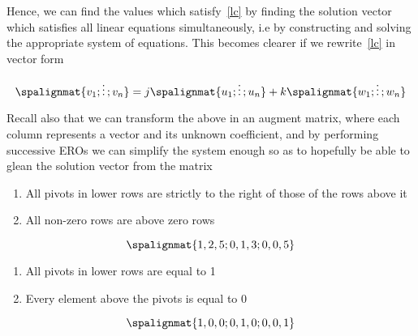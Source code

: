 \documentclass[english,course]{Notes}
\let\mat=\spalignmat
\begin{document}
	      \par{Hence, we can find the values which satisfy~\ref{lc} by finding the solution vector which satisfies all linear equations simultaneously, i.e  by constructing and solving the appropriate system of equations. This becomes clearer if we rewrite~\ref{lc} in vector form }
	      
	      $$ \mat{v_{1};\vdots;v_{n}} = j\mat{u_{1};\vdots;u_{n}} + k\mat{w_{1};\vdots;w_{n}} $$
	      
	      \par{Recall also that we can transform the above in an augment matrix, where each column represents a vector and its unknown coefficient, and by performing successive EROs we can simplify the system enough so as to hopefully be able to glean the solution vector from the matrix}
	      
	      
	      \begin{minipage}{\linewidth}
	      	\centering
	      	\begin{minipage}{0.45\linewidth}
	      		\begin{enumerate}
	      			\item All pivots in lower rows are strictly to the right of those of the rows above it
	      			\item All non-zero rows are above zero rows
	      		\end{enumerate}
	      	\end{minipage}
	      	\hspace{0.05\linewidth}
	      	\begin{minipage}{0.45\linewidth}
	      		$$\mat{1,2,5;0,1,3;0,0,5}$$
	      	\end{minipage}
	      \end{minipage}
	      
	      \begin{minipage}{\linewidth}
	      	\centering
	      	\begin{minipage}{0.45\linewidth}
	      		\begin{enumerate}
	      			\item All pivots in lower rows are equal to 1
	      			\item Every element above the pivots is equal to 0
	      		\end{enumerate}
	      	\end{minipage}
	      	\hspace{0.05\linewidth}
	      	\begin{minipage}{0.45\linewidth}
	      		$$\mat{1,0,0;0,1,0;0,0,1}$$
	      	\end{minipage}
	      \end{minipage}
\end{document}
